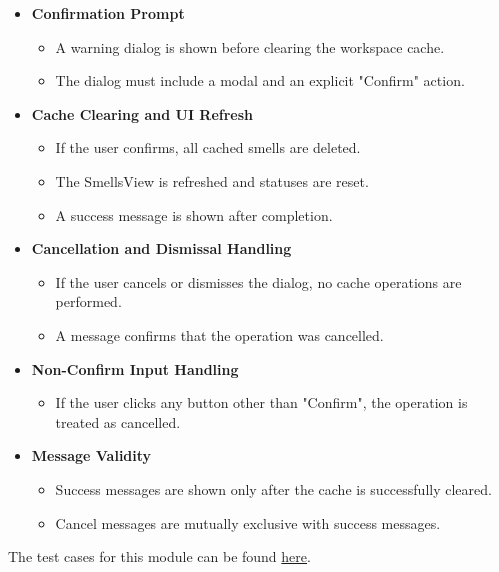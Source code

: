 \documentclass[12pt, titlepage]{article}
\begin{document}
\begin{itemize}
  \item \textbf{Confirmation Prompt}
    \begin{itemize}
      \item A warning dialog is shown before clearing the workspace cache.
      \item The dialog must include a modal and an explicit "Confirm" action.
    \end{itemize}

  \item \textbf{Cache Clearing and UI Refresh}
    \begin{itemize}
      \item If the user confirms, all cached smells are deleted.
      \item The SmellsView is refreshed and statuses are reset.
      \item A success message is shown after completion.
    \end{itemize}

  \item \textbf{Cancellation and Dismissal Handling}
    \begin{itemize}
      \item If the user cancels or dismisses the dialog, no cache operations are performed.
      \item A message confirms that the operation was cancelled.
    \end{itemize}

  \item \textbf{Non-Confirm Input Handling}
    \begin{itemize}
      \item If the user clicks any button other than "Confirm", the operation is treated as cancelled.
    \end{itemize}

  \item \textbf{Message Validity}
    \begin{itemize}
      \item Success messages are shown only after the cache is successfully cleared.
      \item Cancel messages are mutually exclusive with success messages.
    \end{itemize}
\end{itemize}

\noindent The test cases for this module can be found
\href{https://github.com/ssm-lab/capstone--sco-vs-code-plugin/blob/plugin-multi-file/test/wipeWorkCache.test.ts}{here}.
\end{document}

